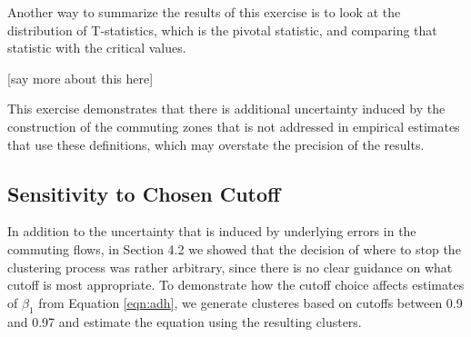 Another way to summarize the results of this exercise is to look at the distribution of T-statistics, which is the pivotal statistic, and comparing that statistic with the critical values.

[say more about this here]

This exercise demonstrates that there is additional uncertainty induced by the construction of the commuting zones that is not addressed in empirical estimates that use these definitions, which may overstate the precision of the results.

\subsection{Sensitivity to Chosen Cutoff}

In addition to the uncertainty that is induced by underlying errors in the commuting flows, in Section 4.2 we showed that the decision of where to stop the clustering process was rather arbitrary, since there is no clear guidance on what cutoff is most appropriate. To demonstrate how the cutoff choice affects estimates of $\beta_1$ from Equation \ref{eqn:adh}, we generate clusteres based on cutoffs between 0.9 and 0.97 and estimate the equation using the resulting clusters.


